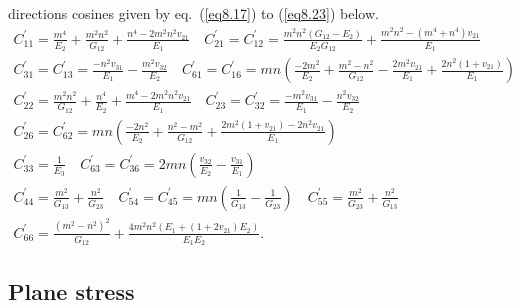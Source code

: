 \documentclass{AeroStructure-ERJohnson}
\begin{document}
directions cosines given by eq.~(\ref{eq8.17}) to (\ref{eq8.23})
below.
\begin{gather}
C_{11}^{\prime}=\frac{m^{4}}{E_{2}}+\frac{m^{2}
n^{2}}{G_{12}}+\frac{n^{4}-2 m^{2} n^{2} v_{21}}{E_{1}} \quad
C_{21}^{\prime}=C_{12}^{\prime}=\frac{m^{2}
n^{2}\left(G_{12}-E_{2}\right)}{E_{2} G_{12}}+\frac{m^{2}
n^{2}-\left(m^{4}+n^{4}\right) v_{21}}{E_{1}}\label{eq8.17}\\[-3pt]
C_{31}^{\prime}=C_{13}^{\prime}=\frac{-n^{2}
{v}_{31}}{E_{1}}-\frac{m^{2} {v}_{32}}{E_{2}} \quad
C_{61}^{\prime}=C_{16}^{\prime}=m n\left(\frac{-2
m^{2}}{E_{2}}+\frac{m^{2}-n^{2}}{G_{12}}-\frac{2 m^{2}
{v}_{21}}{E_{1}}+\frac{2
n^{2}\left(1+v_{21}\right)}{E_{1}}\right)\label{eq8.18}\\[-3pt]
C_{22}^{\prime}=\frac{m^{2}
n^{2}}{G_{12}}+\frac{n^{4}}{E_{2}}+\frac{m^{4}-2 m^{2} n^{2}
{v}_{21}}{E_{1}} \quad
C_{23}^{\prime}=C_{32}^{\prime}=\frac{-m^{2}
{v}_{31}}{E_{1}}-\frac{n^{2}
{v}_{32}}{E_{2}}\label{eq8.19}\\[-3pt]
C_{26}^{\prime}=C_{62}^{\prime}=m n\left(\frac{-2
n^{2}}{E_{2}}+\frac{n^{2}-m^{2}}{G_{12}}+\frac{2
m^{2}\left(1+v_{21}\right)-2 n^{2}
v_{21}}{E_{1}}\right)\label{eq8.20}\\[-3pt]
C_{33}^{\prime}=\frac{1}{E_{3}} \quad
C_{63}^{\prime}=C_{36}^{\prime}=2 m
n\left(\frac{v_{32}}{E_{2}}-\frac{v_{31}}{E_{1}}\right)\label{eq8.21}\\[-3pt]
C^{\prime}_{44}=\frac{m^{2}}{G_{13}}+\frac{n^{2}}{G_{23}} \quad
C_{54}^{\prime}=C_{45}^{\prime}=m
n\left(\frac{1}{G_{13}}-\frac{1}{G_{23}}\right) \quad
C_{55}^{\prime}=\frac{m^{2}}{G_{23}}+\frac{n^{2}}{G_{13}}\label{eq8.22}\\[-3pt]
C_{66}^{\prime}=\frac{\left(m^{2}-n^{2}\right)^{2}}{G_{12}}+\frac{4
m^{2} n^{2}\left(E_{1}+\left(1+2 v_{21}\right) E_{2}\right)}{E_{1}
E_{2}}.\label{eq8.23}
\end{gather}

\subsection{Plane stress}\label{sec8.1.3}
\end{document}
